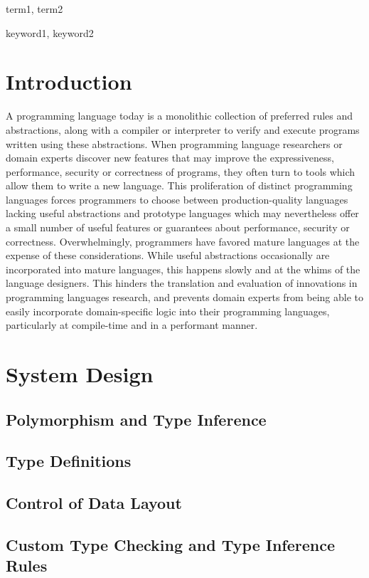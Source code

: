 \documentclass{sigplanconf}
\begin{document}
\terms
term1, term2

\keywords
keyword1, keyword2

\section{Introduction}

A programming language today is a monolithic collection of preferred rules and abstractions, along with a compiler or interpreter to verify and execute programs written using these abstractions. When programming language researchers or domain experts discover new features that may improve the expressiveness, performance, security or correctness of programs, they often turn to tools which allow them to write a new language\cite{abc}. This proliferation of distinct programming languages forces programmers to choose between production-quality languages lacking useful abstractions and prototype languages which may nevertheless offer a small number of useful features or guarantees about performance, security or correctness. Overwhelmingly, programmers have favored mature languages at the expense of these considerations. While useful abstractions occasionally are incorporated into mature languages, this happens slowly and at the whims of the language designers. This hinders the translation and evaluation of innovations in  programming languages research, and prevents domain experts from being able to easily incorporate domain-specific logic into their programming languages, particularly at compile-time and in a performant manner.



\section{System Design}
\subsection{Polymorphism and Type Inference}

\subsection{Type Definitions}

\subsection{Control of Data Layout}

\subsection{Custom Type Checking and Type Inference Rules}
\end{document}
